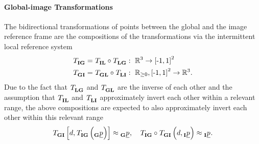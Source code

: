 \paragraph*{Global-image Transformations} $\ $\\
The bidirectional transformations of points between the global and the image reference frame
are the compositions of the transformations via the intermittent local reference system
\begin{align} \label{eq:global_image_transformations}
    \trafo[]{}{\irs\grs}{}{}
    &=
    \trafo[]{}{\irs\lrs}{}{} \circ \trafo[]{}{\lrs\grs}{}{}
    :\ 
    \mathbb{R}^3 \rightarrow \left[\text{-} 1, 1\right]^2 
    \nonumber \\
    \trafo[]{}{\grs\irs}{}{}
    &=
    \trafo[]{}{\grs\lrs}{}{} \circ \trafo[]{}{\lrs\irs}{}{}
    :\ 
    \mathbb{R}_{\ge 0}, \left[\text{-} 1, 1\right]^2 \rightarrow \mathbb{R}^3.
\end{align}
Due to the fact that
$\trafo[]{}{\lrs\grs}{}{}$
and
$\trafo[]{}{\grs\lrs}{}{}$
are the inverse of each other
and the assumption that
$\trafo[]{}{\irs\lrs}{}{}$
and
$\trafo[]{}{\lrs\irs}{}{}$
approximately invert each other within a relevant range,
the above compositions are expected to also approximately invert each other within this relevant range
\begin{equation}
    \trafo[]{}{\grs\irs}{}{} \left[
        d, \trafo[]{}{\irs\grs}{}{} \left( \pos[]{}{}{\grs}{} \right)
    \right]
    \approx
    \pos[]{}{}{\grs}{}
    ,\quad
    \trafo[]{}{\irs\grs}{}{}
    \circ 
    \trafo[]{}{\grs\irs}{}{} \left(
        d, \pos[]{}{}{\irs}{}
    \right)
    \approx
    \pos[]{}{}{\irs}{}.
\end{equation}

